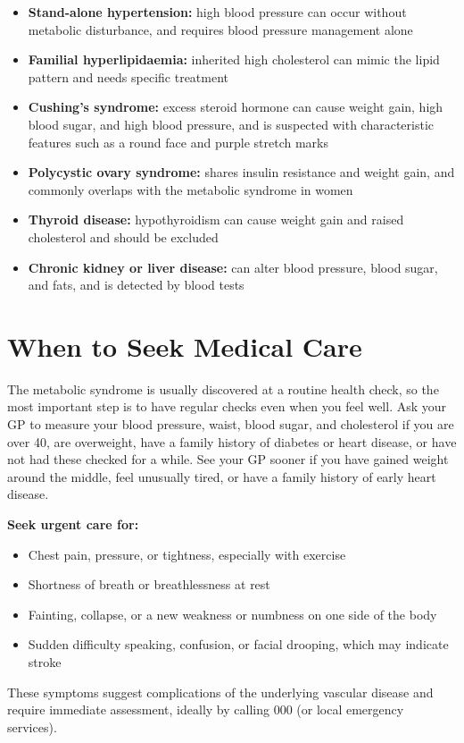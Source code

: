 \begin{itemize}
    \item \textbf{Stand-alone hypertension:} high blood pressure can occur without metabolic disturbance, and requires blood pressure management alone
    \item \textbf{Familial hyperlipidaemia:} inherited high cholesterol can mimic the lipid pattern and needs specific treatment
    \item \textbf{Cushing's syndrome:} excess steroid hormone can cause weight gain, high blood sugar, and high blood pressure, and is suspected with characteristic features such as a round face and purple stretch marks
    \item \textbf{Polycystic ovary syndrome:} shares insulin resistance and weight gain, and commonly overlaps with the metabolic syndrome in women
    \item \textbf{Thyroid disease:} hypothyroidism can cause weight gain and raised cholesterol and should be excluded
    \item \textbf{Chronic kidney or liver disease:} can alter blood pressure, blood sugar, and fats, and is detected by blood tests
\end{itemize}

\section*{When to Seek Medical Care}
The metabolic syndrome is usually discovered at a routine health check, so the most important step is to have regular checks even when you feel well. Ask your GP to measure your blood pressure, waist, blood sugar, and cholesterol if you are over 40, are overweight, have a family history of diabetes or heart disease, or have not had these checked for a while. See your GP sooner if you have gained weight around the middle, feel unusually tired, or have a family history of early heart disease.

\textbf{Seek urgent care for:}
\begin{itemize}
    \item Chest pain, pressure, or tightness, especially with exercise
    \item Shortness of breath or breathlessness at rest
    \item Fainting, collapse, or a new weakness or numbness on one side of the body
    \item Sudden difficulty speaking, confusion, or facial drooping, which may indicate stroke
\end{itemize}
These symptoms suggest complications of the underlying vascular disease and require immediate assessment, ideally by calling 000 (or local emergency services).


